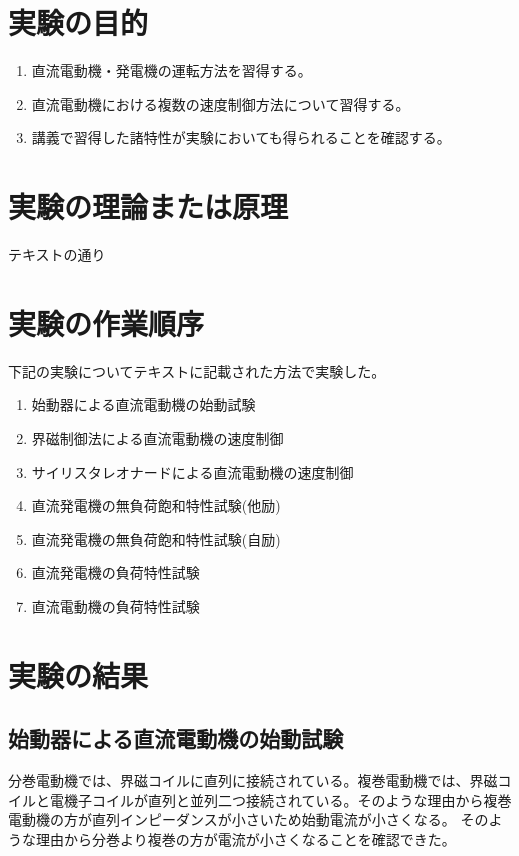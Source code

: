 \documentclass[a4paper,11pt,xelatex,ja=standard]{bxjsarticle}
\begin{document}
\section{実験の目的}
    \begin{enumerate}
        \item 直流電動機・発電機の運転方法を習得する。
        \item 直流電動機における複数の速度制御方法について習得する。
        \item 講義で習得した諸特性が実験においても得られることを確認する。
    \end{enumerate}
\section{実験の理論または原理}
    テキストの通り
\section{実験の作業順序}
    下記の実験についてテキストに記載された方法で実験した。
    \begin{enumerate}
        \item 始動器による直流電動機の始動試験
        \item 界磁制御法による直流電動機の速度制御
        \item サイリスタレオナードによる直流電動機の速度制御
        \item 直流発電機の無負荷飽和特性試験(他励)
        \item 直流発電機の無負荷飽和特性試験(自励)
        \item 直流発電機の負荷特性試験
        \item 直流電動機の負荷特性試験
    \end{enumerate}
\section{実験の結果}
    \subsection{始動器による直流電動機の始動試験}
        分巻電動機では、界磁コイルに直列に接続されている。複巻電動機では、界磁コイルと電機子コイルが直列と並列二つ接続されている。そのような理由から複巻電動機の方が直列インピーダンスが小さいため始動電流が小さくなる。
        そのような理由から分巻より複巻の方が電流が小さくなることを確認できた。
\end{document}
